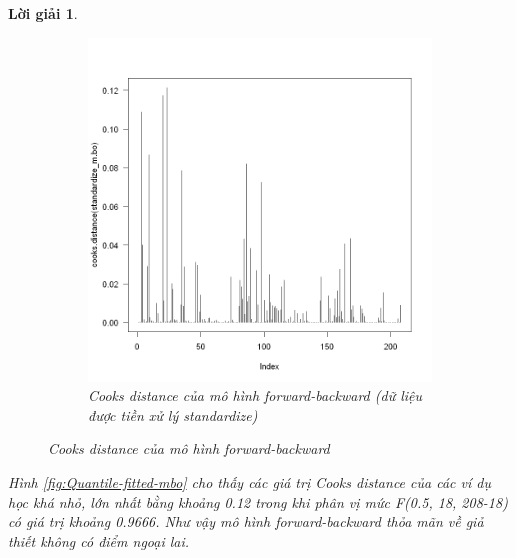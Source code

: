 \documentclass[14pt, a4paper]{article}
\theoremstyle{sltheorem}
\theoremstyle{soltheorem}
\newtheorem*{loigiai}{Lời giải}
\begin{document}
\begin{loigiai}
\begin{figure}[h!]
\begin{subfigure}[b]{0.4\textwidth}
            \includegraphics[width=\textwidth]{figures/standardize_mbo_cooks.png}
            \caption{Cooks distance của mô hình forward-backward (dữ liệu được tiền xử lý standardize)}
        \end{subfigure}
        \caption{Cooks distance của mô hình forward-backward}
        \label{fig:Cooks-distance-mbo}
    \end{figure}

    Hình \ref{fig:Quantile-fitted-mbo} cho thấy các giá trị Cooks distance của các ví dụ học khá nhỏ, lớn nhất bằng khoảng 0.12 trong khi phân vị mức F(0.5, 18, 208-18) có giá trị khoảng 0.9666.
    Như vậy mô hình forward-backward thỏa mãn về giả thiết không có điểm ngoại lai.


\end{loigiai}
\end{document}
